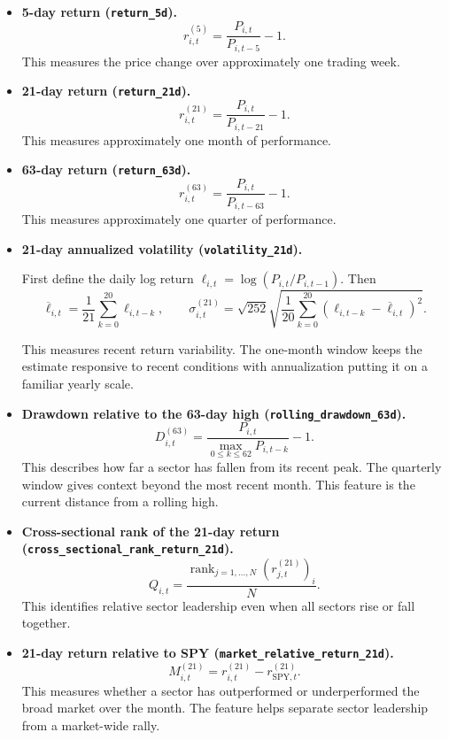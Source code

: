 \documentclass[11pt,letterpaper]{article}
\begin{document}
\begin{itemize}
  \item \textbf{5-day return (\texttt{return\_5d}).}
  \[
    r^{(5)}_{i,t}=\frac{P_{i,t}}{P_{i,t-5}}-1.
  \]
  This measures the price change over approximately one trading week. 

  \item \textbf{21-day return (\texttt{return\_21d}).}
  \[
    r^{(21)}_{i,t}=\frac{P_{i,t}}{P_{i,t-21}}-1.
  \]
  This measures approximately one month of performance. 

  \item \textbf{63-day return (\texttt{return\_63d}).}
  \[
    r^{(63)}_{i,t}=\frac{P_{i,t}}{P_{i,t-63}}-1.
  \]
  This measures approximately one quarter of performance. 

  \item \textbf{21-day annualized volatility
  (\texttt{volatility\_21d}).} 
  
  
  First define the daily log return
  $\ell_{i,t}=\log(P_{i,t}/P_{i,t-1})$. Then
  \[
    \overline\ell_{i,t}=\frac{1}{21}\sum_{k=0}^{20}\ell_{i,t-k},
    \qquad
    \sigma_{i,t}^{(21)}=
      \sqrt{252}\sqrt{\frac{1}{20}\sum_{k=0}^{20}
        (\ell_{i,t-k}-\overline\ell_{i,t})^2}.
  \]

  This measures recent return variability.
  The one-month window keeps the estimate responsive to recent conditions with 
  annualization putting it on a familiar yearly scale.

  \item \textbf{Drawdown relative to the 63-day high
  (\texttt{rolling\_drawdown\_63d}).}
  \[
    D_{i,t}^{(63)}=
      \frac{P_{i,t}}{\max_{0\leq k\leq62}P_{i,t-k}}-1.
  \]
  This describes how far a sector has fallen from its recent peak. The quarterly window
  gives context beyond the most recent month. This feature is the current
  distance from a rolling high.

  \item \textbf{Cross-sectional rank of the 21-day return
  (\texttt{cross\_sectional\_rank\_return\_21d}).}
  \[
    Q_{i,t}=\frac{
      \operatorname{rank}_{j=1,\ldots,N}(r^{(21)}_{j,t})_i}{N}.
  \]
  This identifies relative sector leadership even when all sectors rise or fall together. 

  \item \textbf{21-day return relative to SPY
  (\texttt{market\_relative\_return\_21d}).}
  \[
    M_{i,t}^{(21)}=r^{(21)}_{i,t}-r^{(21)}_{\mathrm{SPY},t}.
  \]
  This measures whether a sector has outperformed or underperformed the broad
  market over the month. The feature helps separate sector leadership from
  a market-wide rally.


\end{itemize}
\end{document}
